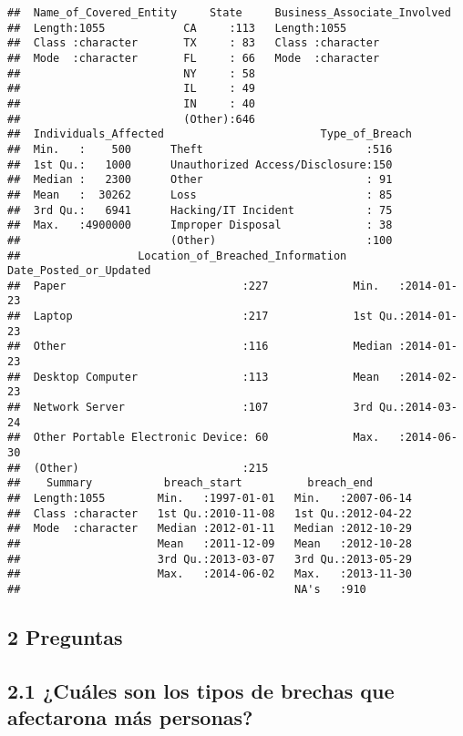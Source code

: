 \documentclass[
]{article}
\begin{document}
\begin{verbatim}
##  Name_of_Covered_Entity     State     Business_Associate_Involved
##  Length:1055            CA     :113   Length:1055                
##  Class :character       TX     : 83   Class :character           
##  Mode  :character       FL     : 66   Mode  :character           
##                         NY     : 58                              
##                         IL     : 49                              
##                         IN     : 40                              
##                         (Other):646                              
##  Individuals_Affected                        Type_of_Breach
##  Min.   :    500      Theft                         :516   
##  1st Qu.:   1000      Unauthorized Access/Disclosure:150   
##  Median :   2300      Other                         : 91   
##  Mean   :  30262      Loss                          : 85   
##  3rd Qu.:   6941      Hacking/IT Incident           : 75   
##  Max.   :4900000      Improper Disposal             : 38   
##                       (Other)                       :100   
##                  Location_of_Breached_Information Date_Posted_or_Updated
##  Paper                           :227             Min.   :2014-01-23    
##  Laptop                          :217             1st Qu.:2014-01-23    
##  Other                           :116             Median :2014-01-23    
##  Desktop Computer                :113             Mean   :2014-02-23    
##  Network Server                  :107             3rd Qu.:2014-03-24    
##  Other Portable Electronic Device: 60             Max.   :2014-06-30    
##  (Other)                         :215                                   
##    Summary           breach_start          breach_end        
##  Length:1055        Min.   :1997-01-01   Min.   :2007-06-14  
##  Class :character   1st Qu.:2010-11-08   1st Qu.:2012-04-22  
##  Mode  :character   Median :2012-01-11   Median :2012-10-29  
##                     Mean   :2011-12-09   Mean   :2012-10-28  
##                     3rd Qu.:2013-03-07   3rd Qu.:2013-05-29  
##                     Max.   :2014-06-02   Max.   :2013-11-30  
##                                          NA's   :910
\end{verbatim}

\hypertarget{preguntas}{%
\subsection{2 Preguntas}\label{preguntas}}

\hypertarget{cuuxe1les-son-los-tipos-de-brechas-que-afectarona-muxe1s-personas}{%
\subsection{2.1 ¿Cuáles son los tipos de brechas que afectarona más
personas?}\label{cuuxe1les-son-los-tipos-de-brechas-que-afectarona-muxe1s-personas}}
\end{document}
